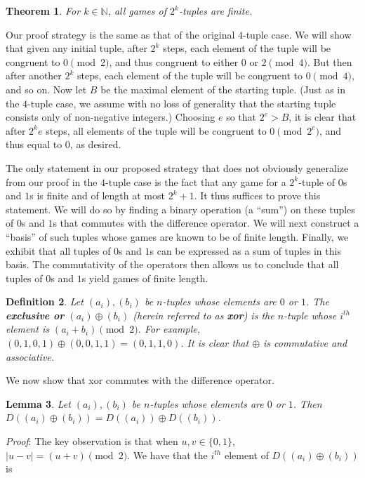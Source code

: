\documentclass[12pt]{amsart}
\newtheorem{theorem}{Theorem}[section]
\newtheorem{definition}[theorem]{Definition}
\newtheorem{lemma}[theorem]{Lemma}
\newcommand{\xor}{\oplus}
\newcommand{\diff}{D}
\newcommand{\znn}{\mathbb{N}}
\begin{document}
\begin{theorem}
For $k\in \znn$, all games of $2^k$-tuples are finite.
\end{theorem}

Our proof strategy is the same as that of the original $4$-tuple case. We will show that given any initial tuple, after $2^k$ steps, each element of the tuple will be congruent to $0\pmod{2}$, and thus congruent to either $0$ or $2\pmod{4}$. But then after another $2^k$ steps, each element of the tuple will be congruent to $0\pmod{4}$, and so on. Now let $B$ be the maximal element of the starting tuple. (Just as in the $4$-tuple case, we assume with no loss of generality that the starting tuple consists only of non-negative integers.) Choosing $e$ so that $2^e>B$, it is clear that after $2^ke$ steps, all elements of the tuple will be congruent to $0\pmod{2^e}$, and thus equal to $0$, as desired.

The only statement in our proposed strategy that does not obviously generalize from our proof in the $4$-tuple case is the fact that any game for a $2^k$-tuple of $0$s and $1$s is finite and of length at most $2^k+1$. It thus suffices to prove this statement. We will do so by finding a binary operation (a ``sum'') on these tuples of $0$s and $1$s that commutes with the difference operator. We will next construct a ``basis'' of such tuples whose games are known to be of finite length. Finally, we exhibit that all tuples of $0$s and $1$s can be expressed as a sum of tuples in this basis. The commutativity of the operators then allows us to conclude that all tuples of $0$s and $1$s yield games of finite length.

\begin{definition}
Let $(a_i),(b_i)$ be $n$-tuples whose elements are $0$ or $1$. The \textbf{exclusive or} $(a_i)\xor (b_i)$ (herein referred to as \textbf{xor}) is the $n$-tuple whose $i^{th}$ element is $(a_i+b_i)\pmod{2}$. For example, $(0,1,0,1)\xor(0,0,1,1)=(0,1,1,0)$. It is clear that $\xor$ is commutative and associative.
\end{definition}

We now show that xor commutes with the difference operator.

\begin{lemma}
Let $(a_i),(b_i)$ be $n$-tuples whose elements are $0$ or $1$. Then $\diff((a_i)\xor (b_i))=\diff((a_i))\xor \diff((b_i))$.
\end{lemma}

\textit{Proof}: The key observation is that when $u,v\in \{0,1\}$, $|u-v|=(u+v)\pmod{2}$. We have that the $i^{th}$ element of $\diff((a_i)\xor (b_i))$ is
\end{document}
